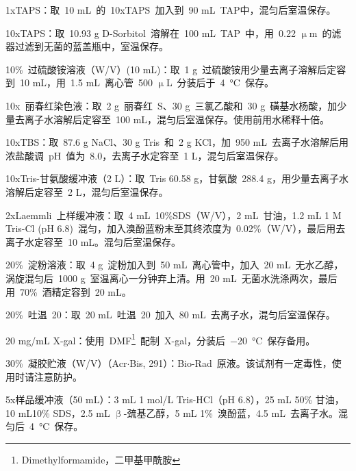 \begin{compactitem}[\FourClowerSolid]
\item 1xTAPS：取\ 10 mL\ 的\ 10xTAPS\ 加入到\ 90 mL\ TAP中，混匀后室温保存。
\vspace{2ex}
\item 10xTAPS：取\ 10.93 g D-Sorbitol\ 溶解在\ 100 mL\ TAP\ 中，用\ 0.22 $\upmu$m\ 的滤器过滤到无菌的蓝盖瓶中，室温保存。
\vspace{2ex}
\item 10\%\ 过硫酸铵溶液（W/V）(10 mL)：取\ 1 g\ 过硫酸铵用少量去离子溶解后定容到\ 10 mL，用\ 1.5 mL\ 离心管\ 500 $\upmu$L\ 分装后于\ \SI{4}{\degreeCelsius}\ 保存。
\vspace{2ex}
\item 10x\ 丽春红染色液：取\ 2 g\ 丽春红\ S、30 g\ 三氯乙酸和\ 30 g\ 磺基水杨酸，加少量去离子水溶解后定容至\ 100 mL，混匀后室温保存。使用前用水稀释十倍。
\vspace{2ex}
\item 10xTBS：取\ 87.6 g NaCl、30 g Tris\ 和\ 2 g KCl，加\ 950 mL\ 去离子水溶解后用浓盐酸调\ pH\ 值为\ 8.0，去离子水定容至\ 1 L，混匀后室温保存。
\vspace{2ex}
\item 10xTris-甘氨酸缓冲液（2 L）：取\ Tris 60.58 g，甘氨酸\ 288.4 g，用少量去离子水溶解后定容至\ 2 L，混匀后室温保存。
\vspace{2ex}
\item 2xLaemmli\ 上样缓冲液：取\ 4 mL\ 10\%SDS（W/V），2 mL\ 甘油，1.2 mL 1 M Tris-Cl (pH 6.8)\ 混匀，加入溴酚蓝粉末至其终浓度为\ 0.02\%（W/V），最后用去离子水定容至\ 10 mL。混匀后室温保存。
\vspace{2ex}
\item 20\%\ 淀粉溶液：取\ 4 g\ 淀粉加入到\ 50 mL\ 离心管中，加入\ 20 mL\ 无水乙醇，涡旋混匀后\ 1000 g\ 室温离心一分钟弃上清。用\ 20 mL\ 无菌水洗涤两次，最后用\ 70\%\ 酒精定容到\ 20 mL。
\vspace{2ex}
\item 20\%\ 吐温\ 20：取\ 20 mL\ 吐温\ 20\ 加入\ 80 mL\ 去离子水，混匀后室温保存。
\vspace{2ex}
\item 20 mg/mL X-gal：使用\ DMF\footnote{Dimethylformamide，二甲基甲酰胺}\ 配制\ X-gal，分装后\ \SI{-20}{\degreeCelsius}\ 保存备用。
\vspace{2ex}
\item 30\%\ 凝胶贮液（W/V）（Acr$\cdot$Bis, 291）：Bio-Rad\ 原液。该试剂有一定毒性，使用时请注意防护。
\vspace{2ex}
\item 5x样品缓冲液（50 mL）：3 mL 1 mol/L Tris-HCl（pH 6.8），25 mL 50\% 甘油，10 mL10\% SDS，2.5 mL $\upbeta$-巯基乙醇，5 mL 1\%\ 溴酚蓝，4.5 mL\ 去离子水。混匀后\ \SI{4}{\degreeCelsius}\ 保存。

\end{compactitem}
